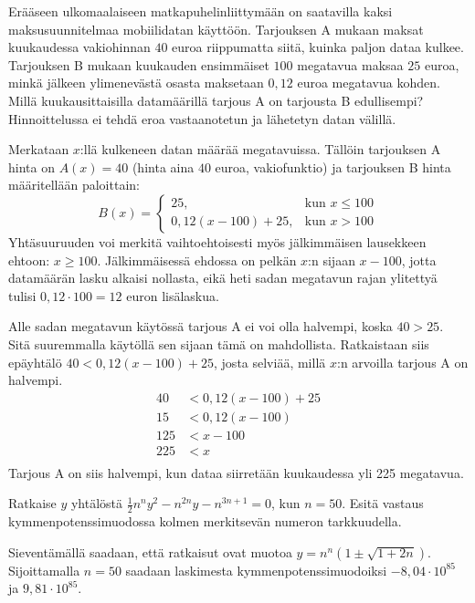\begin{tehtava} %
Erääseen ulkomaalaiseen matkapuhelinliittymään on saatavilla kaksi maksusuunnitelmaa mobiilidatan käyttöön. Tarjouksen A mukaan maksat kuukaudessa vakiohinnan $40$ euroa riippumatta siitä, kuinka paljon dataa kulkee. Tarjouksen B mukaan kuukauden ensimmäiset $100$ megatavua maksaa $25$ euroa, minkä jälkeen ylimenevästä osasta maksetaan $0,12$ euroa megatavua kohden. Millä kuukausittaisilla datamäärillä tarjous A on tarjousta B edullisempi? Hinnoittelussa ei tehdä eroa vastaanotetun ja lähetetyn datan välillä.
	\begin{vastaus}
	Merkataan $x$:llä kulkeneen datan määrää megatavuissa. Tällöin tarjouksen A hinta on $A(x)=40$ (hinta aina $40$ euroa, vakiofunktio) ja tarjouksen B hinta määritellään paloittain:
	$$B(x)=\begin{cases}
	25, & \mbox{kun } x\leq 100 \\
	0,12(x-100)+25, & \mbox{kun } x>100
	\end{cases}$$
Yhtäsuuruuden voi merkitä vaihtoehtoisesti myös jälkimmäisen lausekkeen ehtoon: $x\geq 100$. Jälkimmäisessä ehdossa on pelkän $x$:n sijaan $x-100$, jotta datamäärän lasku alkaisi nollasta, eikä heti sadan megatavun rajan ylitettyä tulisi $0,12\cdot 100=12$ euron lisälaskua.

Alle sadan megatavun käytössä tarjous A ei voi olla halvempi, koska $40>25$. Sitä suuremmalla käytöllä sen sijaan tämä on mahdollista. Ratkaistaan siis epäyhtälö $40<0,12(x-100)+25$, josta selviää, millä $x$:n arvoilla tarjous A on halvempi.
\begin{align*}
40&<0,12(x-100)+25 \\
15 &<0,12(x-100) \\
125&<x-100 \\
225&<x \\
\end{align*}
	Tarjous A on siis halvempi, kun dataa siirretään kuukaudessa yli 225 megatavua.
	\end{vastaus}
\end{tehtava}

\begin{tehtava}
Ratkaise $y$ yhtälöstä $\frac{1}{2}n^n y^2-n^{2n}y-n^{3n+1}=0$, kun $n=50$. Esitä vastaus kymmenpotenssimuodossa kolmen merkitsevän numeron tarkkuudella.
	\begin{vastaus}
	Sieventämällä saadaan, että ratkaisut ovat muotoa $y=n^n (1\pm \sqrt{1+2n})$. Sijoittamalla $n=50$ saadaan laskimesta kymmenpotenssimuodoiksi $-8,04\cdot 10^{85}$ ja $9,81\cdot 10^{85}$.
	\end{vastaus}
\end{tehtava}

